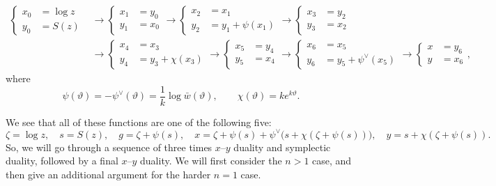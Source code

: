 \documentclass[10pt,a4paper,oneside,no-math,reqno]{amsart}%
\theoremstyle{plain}
\theoremstyle{definition}
\theoremstyle{remark}
\numberwithin{equation}{section}
\renewcommand{\theta}{\vartheta}
\newcommand{\1}{\mathds{1}}
\newcommand{\<}{\langle}
\renewcommand{\>}{\rangle}
\begin{document}
\begin{equation}\label{ChainOfTransformations}
	\begin{split}
		\begin{cases}
			x_0 & = \log z
			\\
			y_0 & = S(z)
		\end{cases}
		&\to
		\begin{cases}
			x_1 & = y_0
			\\
			y_1 & = x_0
		\end{cases}
		\to
		\begin{cases}
			x_2 & = x_1
			\\
			y_2 & = y_1 + \psi (x_1)
		\end{cases}
		\to
		\begin{cases}
			x_3 & = y_2
			\\
			y_3 & = x_2
		\end{cases}
		\\
		&\to
		\begin{cases}
			x_4 & = x_3
			\\
			y_4 & = y_3 + \chi (x_3)
		\end{cases}
		\to
		\begin{cases}
			x_5 & = y_4
			\\
			y_5 & = x_4
		\end{cases}
		\to
		\begin{cases}
			x_6 & = x_5
			\\
			y_6 & = y_5 + \psi^\vee (x_5)
		\end{cases}
		\to
		\begin{cases}
			x & = y_6
			\\
			y & = x_6
		\end{cases}
		,
	\end{split}
\end{equation}
where
\begin{equation}
	\psi( \theta ) 
	= 
	- \psi^\vee (\theta ) 
	= 
	\frac{1}{k} \log \bar{w} (\theta ) , 
	\qquad 
	\chi (\theta ) 
	= 
	k e^{k \theta} .
\end{equation}

We see that all of these functions are one of the following five:
\begin{equation}\label{FiveFunctions}
	\zeta
	=
	\log z , 
	\quad 
	s 
	=
	S(z) , 
	\quad 
	g
	=
	\zeta + \psi (s) , 
	\quad 
	x
	=
	\zeta + \psi (s) + \psi^\vee \big( s + \chi (\zeta + \psi (s)) \big) , 
	\quad 
	y
	=
	s + \chi (\zeta + \psi (s)) .
\end{equation}
So, we will go through a sequence of three times $x$--$y$ duality and symplectic duality, followed by a final $ x$--$y$ duality. We will first consider the $ n > 1$ case, and then give an additional argument for the harder $ n =1 $ case.
\end{document}
